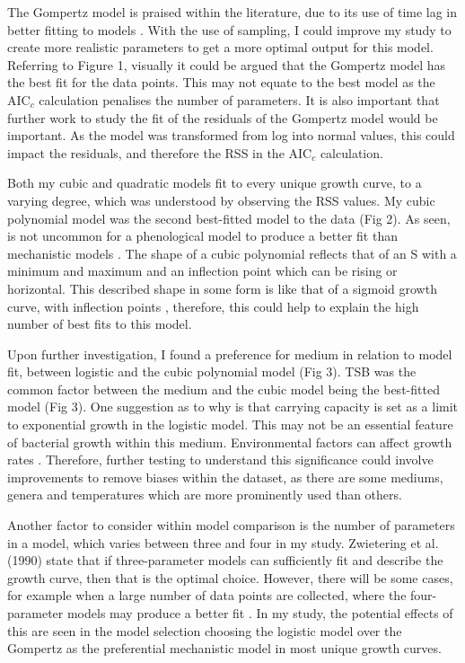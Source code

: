 \documentclass[11pt]{article}
\begin{document}
The Gompertz model is praised within the literature, due to its use of time lag in better fitting to models \cite{zwietering_modeling_1990}. With the use of sampling, I could improve my study to create more realistic parameters to get a more optimal output for this model. Referring to Figure 1, visually it could be argued that the Gompertz model has the best fit for the data points. This may not equate to the best model as the AIC$_c$ calculation penalises the number of parameters. It is also important that further work to study the fit of the residuals of the Gompertz model would be important. As the model was transformed from log into normal values, this could impact the residuals, and therefore the RSS in the AIC$_c$ calculation. 

Both my cubic and quadratic models fit to every unique growth curve, to a varying degree, which was understood by observing the RSS values. My cubic polynomial model was the second best-fitted model to the data (Fig 2). As seen, is not uncommon for a phenological model to produce a better fit than mechanistic models \cite{white_should_2019}. The shape of a cubic polynomial reflects that of an S with a minimum and maximum and an inflection point which can be rising or horizontal. This described shape in some form is like that of a sigmoid growth curve, with inflection points \cite{zwietering_modeling_1990}, therefore, this could help to explain the high number of best fits to this model. 

Upon further investigation, I found a preference for medium in relation to model fit, between logistic and the cubic polynomial model (Fig 3). TSB was the common factor between the medium and the cubic model being the best-fitted model (Fig 3). One suggestion as to why is that carrying capacity is set as a limit to exponential growth in the logistic model. This may not be an essential feature of bacterial growth within this medium. Environmental factors can affect growth rates \cite{sibly_population_2002,baranyi_dynamic_1994}. Therefore, further testing to understand this significance could involve improvements to remove biases within the dataset, as there are some mediums, genera and temperatures which are more prominently used than others. 

Another factor to consider within model comparison is the number of parameters in a model, which varies between three and four in my study. Zwietering et al. (1990) state that if three-parameter models can sufficiently fit and describe the growth curve, then that is the optimal choice. However, there will be some cases, for example when a large number of data points are collected, where the four-parameter models may produce a better fit \cite{zwietering_modeling_1990}. In my study, the potential effects of this are seen in the model selection choosing the logistic model over the Gompertz as the preferential mechanistic model in most unique growth curves. 
\end{document}
